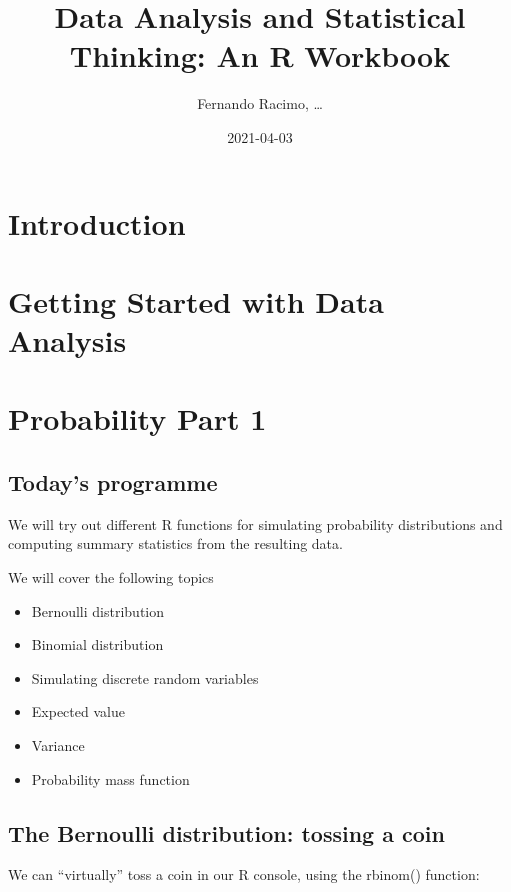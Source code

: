 \documentclass[
]{book}
\title{Data Analysis and Statistical Thinking: An R Workbook}
\author{Fernando Racimo, \ldots{}}
\date{2021-04-03}
\providecommand{\tightlist}{%
  \setlength{\itemsep}{0pt}\setlength{\parskip}{0pt}}
\begin{document}
\maketitle

{
\setcounter{tocdepth}{1}
\tableofcontents
}
\hypertarget{introduction}{%
\chapter{Introduction}\label{introduction}}

\hypertarget{intro}{%
\chapter{Getting Started with Data Analysis}\label{intro}}

\hypertarget{prob1}{%
\chapter{Probability Part 1}\label{prob1}}

\hypertarget{todays-programme}{%
\section{Today's programme}\label{todays-programme}}

We will try out different R functions for simulating probability distributions and computing summary statistics from the resulting data.

We will cover the following topics

\begin{itemize}
\tightlist
\item
  Bernoulli distribution
\item
  Binomial distribution
\item
  Simulating discrete random variables
\item
  Expected value
\item
  Variance
\item
  Probability mass function
\end{itemize}

\hypertarget{the-bernoulli-distribution-tossing-a-coin}{%
\section{The Bernoulli distribution: tossing a coin}\label{the-bernoulli-distribution-tossing-a-coin}}

We can ``virtually'' toss a coin in our R console, using the rbinom() function:
\end{document}
